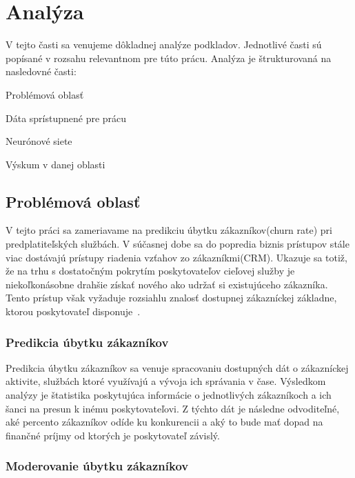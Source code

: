 \newpage
\chapter{Analýza}
\label{ch:Analýza}
V tejto časti sa venujeme dôkladnej analýze podkladov. Jednotlivé časti sú popísané v rozsahu relevantnom pre túto prácu. Analýza je štrukturovaná na nasledovné časti:

\begin{my_itemize}
	\item {Problémová oblasť}
	\item {Dáta sprístupnené pre prácu}
	\item {Neurónové siete}
	\item {Výskum v danej oblasti}
\end{my_itemize}

\section{Problémová oblasť}
\label{analyza_problemova_oblast}

V tejto práci sa zameriavame na predikciu úbytku zákazníkov(churn rate) pri predplatiteľských službách. V súčasnej dobe sa do popredia biznis prístupov stále viac dostávajú prístupy riadenia vzťahov zo zákazníkmi(CRM). Ukazuje sa totiž, že na trhu s dostatočným pokrytím poskytovateľov cieľovej služby je niekoľkonásobne drahšie získať nového ako udržať si existujúceho zákazníka. Tento prístup však vyžaduje rozsiahlu znalosť dostupnej zákazníckej základne, ktorou poskytovateľ disponuje~\cite{sharma2013neural}.
 \newline

\subsection{Predikcia úbytku zákazníkov}
\label{analyza_ubytok_zakaznikov}

Predikcia úbytku zákazníkov sa venuje spracovaniu dostupných dát o zákazníckej aktivite, službách ktoré využívajú a vývoja ich správania v čase. Výsledkom analýzy je štatistika poskytujúca informácie o jednotlivých zákazníkoch a ich šanci na presun k inému poskytovateľovi. Z týchto dát je následne odvoditeľné, aké percento zákazníkov odíde ku konkurencii a aký to bude mať dopad na finančné príjmy od ktorých je poskytovateľ závislý. 

\subsection{Moderovanie úbytku zákazníkov}
\label{analyza_moderovanie_ubytku}

